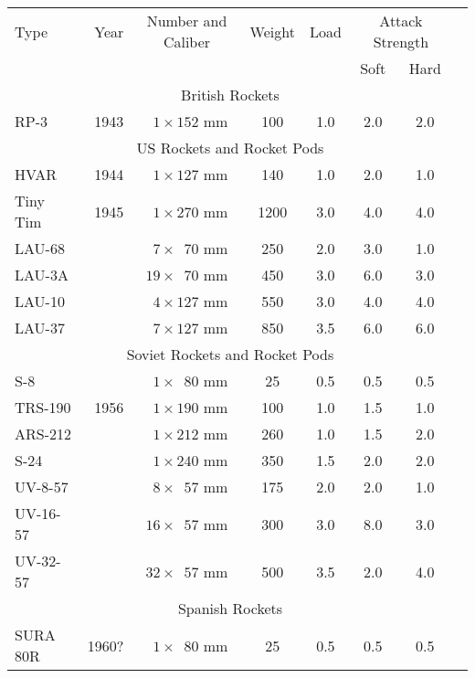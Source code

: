\begin{twocolumntablefloat}
\begin{twocolumntable}
\begin{tabular}{lrcccccl}
\toprule
Type&
Year&
Number and Caliber&
Weight&
Load&
\multicolumn{2}{c}{Attack Strength}\\
\cmidrule{6-7}
&&&&&Soft&Hard\\
\midrule
\multicolumn{7}{c}{British Rockets}\\
\midrule
RP-3     &1943&$\phantom{0}1 \times \phantom{}152$ mm&\phantom{0}100&1.0&2.0&2.0\\
\midrule
\multicolumn{7}{c}{US Rockets and Rocket Pods}\\
\midrule
HVAR     &1944&$\phantom{0}1 \times \phantom{}127$ mm&\phantom{0}140&1.0&2.0&1.0\\
Tiny Tim &1945&$\phantom{0}1 \times \phantom{}270$ mm&\phantom{}1200&3.0&4.0&4.0\\
LAU-68   &    &$\phantom{0}7 \times \phantom{0}70$ mm&\phantom{0}250&2.0&3.0&1.0\\
LAU-3A   &    &$\phantom{}19 \times \phantom{0}70$ mm&\phantom{0}450&3.0&6.0&3.0\\
LAU-10   &    &$\phantom{0}4 \times \phantom{}127$ mm&\phantom{0}550&3.0&4.0&4.0\\
LAU-37   &    &$\phantom{0}7 \times \phantom{}127$ mm&\phantom{0}850&3.5&6.0&6.0\\
\midrule
\multicolumn{7}{c}{Soviet Rockets and Rocket Pods}\\
\midrule
S-8      &    &$\phantom{0}1 \times \phantom{0}80$ mm&\phantom{00}25&0.5&0.5&0.5\\
TRS-190  &1956&$\phantom{0}1 \times \phantom{}190$ mm&\phantom{0}100&1.0&1.5&1.0\\
ARS-212  &    &$\phantom{0}1 \times \phantom{}212$ mm&\phantom{0}260&1.0&1.5&2.0\\
S-24     &    &$\phantom{0}1 \times \phantom{}240$ mm&\phantom{0}350&1.5&2.0&2.0\\
UV-8-57  &    &$\phantom{0}8 \times \phantom{0}57$ mm&\phantom{0}175&2.0&2.0&1.0\\
UV-16-57 &    &$\phantom{}16 \times \phantom{0}57$ mm&\phantom{0}300&3.0&8.0&3.0\\
UV-32-57 &    &$\phantom{}32 \times \phantom{0}57$ mm&\phantom{0}500&3.5&2.0&4.0\\
\midrule
\multicolumn{7}{c}{Spanish Rockets}\\
\midrule
SURA 80R &1960?&$\phantom{0}1 \times \phantom{0}80$ mm&\phantom{00}25&0.5&0.5&0.5\\
\bottomrule
\end{tabular}
\end{twocolumntable}
\end{twocolumntablefloat}